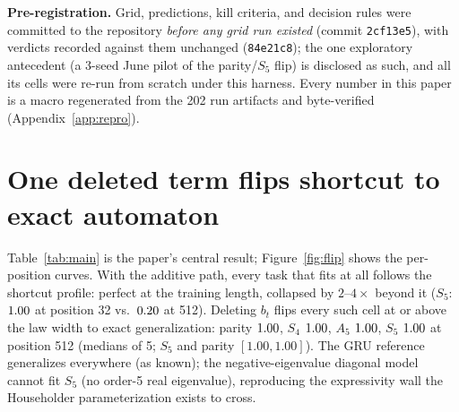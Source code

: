 \documentclass[10pt]{article}
\newcommand{\bt}{b_t}
\begin{document}
\textbf{Pre-registration.} Grid, predictions, kill criteria, and decision rules were committed to the
repository \emph{before any grid run existed} (commit \texttt{2cf13e5}), with verdicts recorded
against them unchanged (\texttt{84e21c8}); the one exploratory antecedent (a 3-seed June pilot of the
parity/$S_5$ flip) is disclosed as such, and all its cells were re-run from scratch under this
harness. Every number in this paper is a macro regenerated from the 202 run artifacts and
byte-verified (Appendix~\ref{app:repro}).

\section{One deleted term flips shortcut to exact automaton}\label{sec:flip}
Table~\ref{tab:main} is the paper's central result; Figure~\ref{fig:flip} shows the per-position
curves. With the additive path, every task that fits at all follows the shortcut profile: perfect at
the training length, collapsed by $2$--$4\times$ beyond it ($S_5$: $1.00$ at
position 32 vs.\ $0.20$ at 512). Deleting $\bt$ flips every such cell at or above
the law width to exact generalization: parity $1.00$, $S_4$
$1.00$, $A_5$ $1.00$, $S_5$
$1.00$ at position 512 (medians of 5; $S_5$ and parity $[1.00,1.00]$). The GRU
reference generalizes everywhere (as known); the negative-eigenvalue diagonal model cannot fit $S_5$
(no order-5 real eigenvalue), reproducing the expressivity wall the Householder parameterization
exists to cross.
\end{document}
